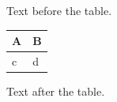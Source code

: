 \documentclass[12pt]{article}
\begin{document}
Text before the table.

\begin{tabular}{||l||l||}\hline\hline A & B\\\hline\hline c & d\\\hline\end{tabular}

Text after the table.
\end{document}
